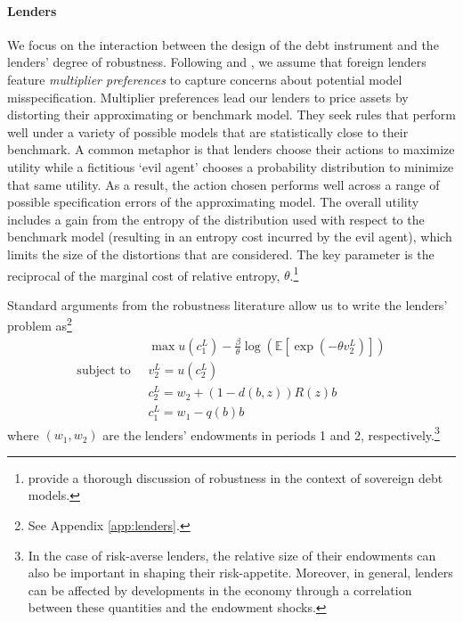 \paragraph{Lenders} We focus on the interaction between the design of the debt instrument and the lenders' degree of robustness. Following \citet{HansenSargent2001} and \citet{PouzoPresno2016}, we assume that foreign lenders feature \emph{multiplier preferences} to capture concerns about potential model misspecification. Multiplier preferences lead our lenders to price assets by distorting their approximating or benchmark model. 
They seek rules that perform well under a variety of possible models that are statistically close to their benchmark. A common metaphor is that lenders choose their actions to maximize utility while a fictitious `evil agent' chooses a probability distribution to minimize that same utility. 
As a result, the action chosen performs well across a range of possible specification errors of the approximating model. The overall utility includes a gain from the entropy of the distribution used with respect to the benchmark model (resulting in an entropy cost incurred by the evil agent), which limits the size of the distortions that are considered. The key parameter is the reciprocal of the marginal cost of relative entropy, $\theta$.\footnote{\citet{PouzoPresno2016} provide a thorough discussion of robustness in the context of sovereign debt models.}

Standard arguments from the robustness literature allow us to write the lenders' problem as\footnote{See Appendix \ref{app:lenders}.}
\begin{align*}
	&\max u(c_1^L) - \frac{\beta}{\theta} \log \left( \mathbb{E}\left[ \exp(-\theta v_2^L) \right] \right) \\
	\text{subject to }\;
	& v_2^L = u(c_2^L) \\
	& c_2^L = w_2 + (1-d(b,z)) R(z) b \\
	& c_1^L = w_1 - q(b) b
\end{align*}
where $(w_1, w_2)$ are the lenders' endowments in periods 1 and 2, respectively.\footnote{In the case of risk-averse lenders, the relative size of their endowments can also be important in shaping their risk-appetite. Moreover, in general, lenders can be affected by developments in the economy through a correlation between these quantities and the endowment shocks.}

